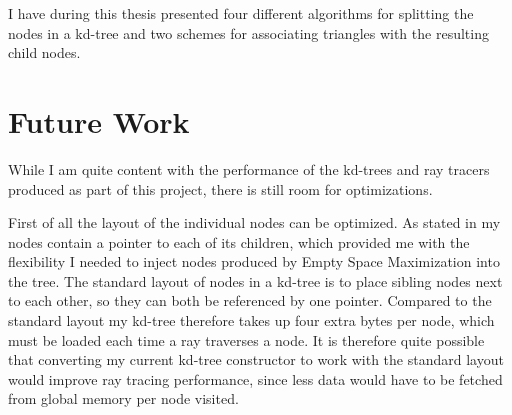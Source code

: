 
I have during this thesis presented four different algorithms for splitting the
nodes in a kd-tree and two schemes for associating triangles with the resulting
child nodes.










\chapter{Future Work}\label{chp:future}


While I am quite content with the performance of the kd-trees and ray tracers
produced as part of this project, there is still room for optimizations.


First of all the layout of the individual nodes can be optimized. As stated in
 my nodes contain a pointer to each of its
children, which provided me with the flexibility I needed to inject nodes
produced by Empty Space Maximization into the tree. The standard layout of nodes
in a kd-tree is to place sibling nodes next to each other, so they can both be
referenced by one pointer. Compared to the standard layout my kd-tree therefore
takes up four extra bytes per node, which must be loaded each time a ray
traverses a node. It is therefore quite possible that converting my current
kd-tree constructor to work with the standard layout would improve ray tracing
performance, since less data would have to be fetched from global memory per
node visited.



